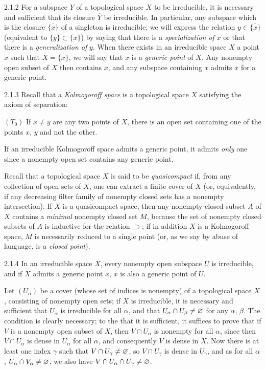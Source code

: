 \documentclass{book}
\begin{document}
\begin{env}{2.1.2}
\label{env-0.2.1.2}
For a subspace $Y$ of a topological space $X$ to be irreducible, it is necessary and
sufficient that its closure $\overline{Y}$ be irreducible. In particular, any subspace
which is the closure $\overline{\{x\}}$ of a singleton is irreducible;
we will express the relation $y\in\overline{\{x\}}$ (equivalent to
$\overline{\{y\}}\subset\overline{\{x\}}$) by saying that there is a \emph{specialization of}
$x$ or that there is a \emph{generalization of} $y$. When there exists in an irreducible
space $X$ a point $x$ such that $X=\overline{\{x\}}$, we will say that $x$ is a
\emph{generic point} of $X$. Any nonempty open subset of $X$ then contains $x$, and any
subspace containing $x$ admits $x$ for a generic point.
\end{env}

\begin{env}{2.1.3}
\label{env-0.2.1.3}
Recall that a \emph{Kolmogoroff space} is a topological space $X$ satisfying the axiom
of separation:

$(T_0)$ If $x\neq y$ are any two points of $X$, there is an open set containing one of
the points $x$, $y$ and not the other.

If an irreducible Kolmogoroff space admits a generic point, it admits \emph{only} one
since a nonempty open set contains any generic point.

Recall that a topological space $X$ is said to be \emph{quasicompact} if, from any
collection of open sets of $X$, one can extract a finite cover of $X$ (or, equivalently,
if any decreasing filter family of nonempty closed sets has a nonempty intersection). If
$X$ is a quasicompact space, then any nonempty closed subset $A$ of $X$ contains a \emph{minimal}
nonempty closed set $M$, because the set of nonempty closed subsets of $A$ is inductive for
the relation $\supset$; if in addition $X$ is a Kolmogoroff space, $M$ is necessarily reduced
to a single point (or, as we say by abuse of language, is a \emph{closed point}).
\end{env}

\begin{env}{2.1.4}
\label{env-0.2.1.4}
In an irreducible space $X$, every nonempty open subspace $U$ is irreducible, and if $X$
admits a generic point $x$, $x$ is also a generic point of $U$.

Let $(U_\alpha)$ be a cover (whose set of indices is nonempty) of a topological space $X$,
consisting of nonempty open sets; if $X$ is irreducible, it is necessary and sufficient that
$U_\alpha$ is irreducible for all $\alpha$, and that $U_\alpha\cap U_\beta\neq\varnothing$ for any
$\alpha$, $\beta$. The condition is clearly necessary; to the that it is sufficient, it suffices
to prove that if $V$ is a nonempty open subset of $X$, then $V\cap U_\alpha$ is nonempty for all
$\alpha$, since then $V\cap U_\alpha$ is dense in $U_\alpha$ for all $\alpha$, and consequently
$V$ is dense in $X$. Now there is at least one index $\gamma$ such that $V\cap U_\gamma\neq\varnothing$,
so $V\cap U_\gamma$ is dense in $U_\gamma$, and as for all $\alpha$, $U_\alpha\cap V_\alpha\neq\varnothing$,
we also have $V\cap U_\alpha\cap U_\gamma\neq\varnothing$.
\end{env}
\end{document}
